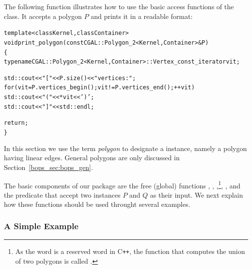 The following function illustrates how to use the basic access functions
of the  class. It accepts a polygon $P$ and prints it in
a readable format:
\begin{alltt}
template<class Kernel, class Container>
void print_polygon (const CGAL::Polygon_2<Kernel, Container>& P)
\{
  typename CGAL::Polygon_2<Kernel, Container>::Vertex_const_iterator  vit;

  std::cout << "[ " << P.size() << " vertices:";
  for (vit = P.vertices_begin(); vit != P.vertices_end(); ++vit)
    std::cout << " (" << *vit << ')';
  std::cout << " ]" << std::endl;

  return;
\}
\end{alltt}

In this section we use the term {\em polygon} to designate a 
instance, namely a polygon having linear edges. General polygons are only
discussed in Section~\ref{bops_sec:bops_gen}.

The basic components of our package are the free (global) functions
,
, ,\footnote{As the word  is
a reserved word in {C}{\tt ++}, the function that computes the union of
two polygons is called .}, ,
 and the predicate  that
accept two  instances $P$ and $Q$ as their input. We next
explain how these functions should be used throught several examples.

\subsubsection*{A Simple Example}

